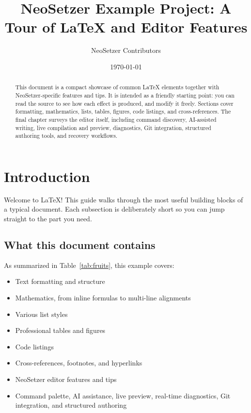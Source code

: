 \documentclass[11pt]{article}
\title{NeoSetzer Example Project: A Tour of \LaTeX{} and Editor Features}
\author{NeoSetzer Contributors}
\date{\today}
\theoremstyle{definition}
\theoremstyle{plain}
\begin{document}
\maketitle
\thispagestyle{empty}

\clearpage

\tableofcontents
\newpage

\begin{abstract}
This document is a compact showcase of common \LaTeX{} elements
together with NeoSetzer-specific features and tips.
It is intended as a friendly starting point: you can read the source
to see how each effect is produced, and modify it freely.
Sections cover formatting, mathematics, lists, tables, figures,
code listings, and cross-references.
The final chapter surveys the editor itself, including command discovery,
AI-assisted writing, live compilation and preview, diagnostics, Git
integration, structured authoring tools, and recovery workflows.
\end{abstract}

\section{Introduction}
\label{sec:intro}

Welcome to \LaTeX{}!
This guide walks through the most useful building blocks of a typical
document.
Each subsection is deliberately short so you can jump straight to the
part you need.

\subsection{What this document contains}
\label{sec:intro:contains}

As summarized in Table~\ref{tab:fruits}, this example covers:

\begin{itemize}[noitemsep]
    \item Text formatting and structure
    \item Mathematics, from inline formulas to multi-line alignments
    \item Various list styles
    \item Professional tables and figures
    \item Code listings
    \item Cross-references, footnotes, and hyperlinks
    \item NeoSetzer editor features and tips
    \item Command palette, AI assistance, live preview, real-time
          diagnostics, Git integration, and structured authoring
\end{itemize}
\end{document}
